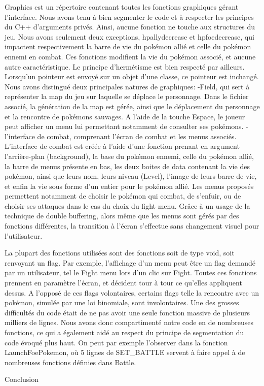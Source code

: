 \documentclass[a4paper,twoside, openany,11pt]{book}
\begin{document}
Graphics est un répertoire contenant toutes les fonctions graphiques gérant l'interface. Nous avons tenu à bien segmenter le code et à respecter les principes du C++ d'arguments privés. Ainsi, aucune fonction ne touche aux structures du jeu. Nous avons seulement deux exceptions, hpallydecrease et hpfoedecrease, qui impactent respectivement la barre de vie du pokémon allié et celle du pokémon ennemi en combat. Ces fonctions modifient la vie du pokémon associé, et aucune autre caractéristique. Le principe d'hermétisme est bien respecté par ailleurs. Lorsqu'un pointeur est envoyé sur un objet d'une classe, ce pointeur est inchangé.
Nous avons distingué deux principales natures de graphiques:
-Field, qui sert à représenter la map du jeu sur laquelle se déplace le personnage. Dans le fichier associé, la génération de la map est gérée, ainsi que le déplacement du personnage et la rencontre de pokémons sauvages. A l'aide de la touche Espace, le joueur peut afficher un menu lui permettant notamment de consulter ses pokémons.
-l'interface de combat, comprenant l'écran de combat et les menus associés. L'interface de combat est créée à l'aide d'une fonction prenant en argument l'arrière-plan (background), la base du pokémon ennemi, celle du pokémon allié, la barre de menus présente en bas, les deux boites de data contenant la vie des pokémon, ainsi que leurs nom, leurs niveau (Level), l'image de leurs barre de vie, et enfin la vie sous forme d'un entier pour le pokémon allié.
Les menus proposés permettent notamment de choisir le pokémon qui combat, de s'enfuir, ou de choisir ses attaques dans le cas du choix du fight menu. Grâce à un usage de la technique de double buffering, alors même que les menus sont gérés par des fonctions différentes, la transition à l'écran s'effectue sans changement visuel pour l'utilisateur.

La plupart des fonctions utilisées sont des fonctions soit de type void, soit renvoyant un flag. Par exemple, l'affichage d'un menu peut être un flag demandé par un utilisateur, tel le Fight menu lors d'un clic sur Fight. Toutes ces fonctions prennent en paramètre l'écran, et décident tour à tour ce qu'elles appliquent dessus. A l'opposé de ces flags volontaires, certains flags telle la rencontre avec un pokémon, simulée par une loi binomiale, sont involontaires.
Une des grosses difficultés du code était de ne pas avoir une seule fonction massive de plusieurs milliers de lignes. Nous avons donc compartimenté notre code en de nombreuses fonctions, ce qui a également aidé au respect du principe de segmentation du code évoqué plus haut. On peut par exemple l'observer dans la fonction LaunchFoePokemon, où 5 lignes de SET\_BATTLE servent à faire appel à de nombreuses fonctions définies dans Battle.

\newpage
\pagestyle{empty}

{Conclusion}
\end{document}
